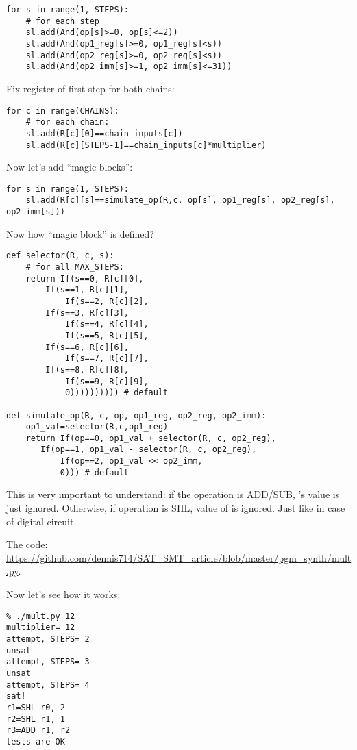 \begin{lstlisting}
for s in range(1, STEPS):
    # for each step
    sl.add(And(op[s]>=0, op[s]<=2))
    sl.add(And(op1_reg[s]>=0, op1_reg[s]<s))
    sl.add(And(op2_reg[s]>=0, op2_reg[s]<s))
    sl.add(And(op2_imm[s]>=1, op2_imm[s]<=31))
\end{lstlisting}

Fix register of first step for both chains:

\begin{lstlisting}
for c in range(CHAINS):
    # for each chain:
    sl.add(R[c][0]==chain_inputs[c])
    sl.add(R[c][STEPS-1]==chain_inputs[c]*multiplier)
\end{lstlisting}

Now let's add ``magic blocks'':

\begin{lstlisting}
for s in range(1, STEPS):
    sl.add(R[c][s]==simulate_op(R,c, op[s], op1_reg[s], op2_reg[s], op2_imm[s]))
\end{lstlisting}

Now how ``magic block'' is defined?

\begin{lstlisting}
def selector(R, c, s):
    # for all MAX_STEPS:
    return If(s==0, R[c][0],
	    If(s==1, R[c][1],
            If(s==2, R[c][2],
	    If(s==3, R[c][3],
            If(s==4, R[c][4],
            If(s==5, R[c][5],
	    If(s==6, R[c][6],
            If(s==7, R[c][7],
	    If(s==8, R[c][8],
            If(s==9, R[c][9],
	        0)))))))))) # default

def simulate_op(R, c, op, op1_reg, op2_reg, op2_imm):
    op1_val=selector(R,c,op1_reg)
    return If(op==0, op1_val + selector(R, c, op2_reg),
	   If(op==1, op1_val - selector(R, c, op2_reg),
           If(op==2, op1_val << op2_imm,
	       0))) # default
\end{lstlisting}

This is very important to understand: if the operation is ADD/SUB, 's value is just ignored.
Otherwise, if operation is SHL, value of  is ignored.
Just like in case of digital circuit.

The code: \url{https://github.com/dennis714/SAT_SMT_article/blob/master/pgm_synth/mult.py}.

Now let's see how it works:

\begin{lstlisting}
% ./mult.py 12
multiplier= 12
attempt, STEPS= 2
unsat
attempt, STEPS= 3
unsat
attempt, STEPS= 4
sat!
r1=SHL r0, 2
r2=SHL r1, 1
r3=ADD r1, r2
tests are OK
\end{lstlisting}

